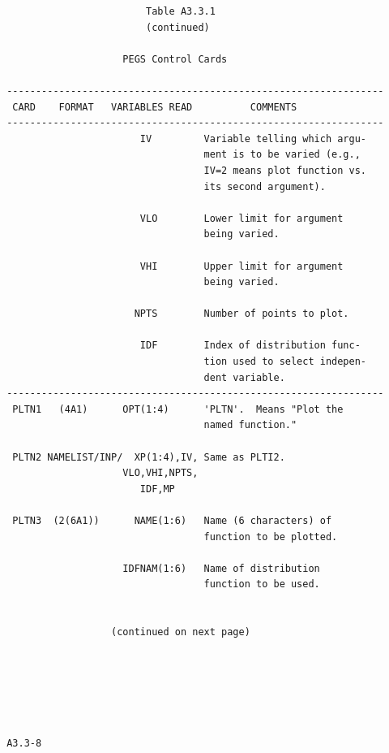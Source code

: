 \newpage {} \begin{verbatim}
                         Table A3.3.1
                         (continued)

                     PEGS Control Cards

 -----------------------------------------------------------------
  CARD    FORMAT   VARIABLES READ          COMMENTS
 -----------------------------------------------------------------
                        IV         Variable telling which argu-
                                   ment is to be varied (e.g.,
                                   IV=2 means plot function vs.
                                   its second argument).

                        VLO        Lower limit for argument
                                   being varied.

                        VHI        Upper limit for argument
                                   being varied.

                       NPTS        Number of points to plot.

                        IDF        Index of distribution func-
                                   tion used to select indepen-
                                   dent variable.
 -----------------------------------------------------------------
  PLTN1   (4A1)      OPT(1:4)      'PLTN'.  Means "Plot the
                                   named function."

  PLTN2 NAMELIST/INP/  XP(1:4),IV, Same as PLTI2.
                     VLO,VHI,NPTS,
                        IDF,MP

  PLTN3  (2(6A1))      NAME(1:6)   Name (6 characters) of
                                   function to be plotted.

                     IDFNAM(1:6)   Name of distribution
                                   function to be used.


                   (continued on next page)






 A3.3-8
\end{verbatim}
